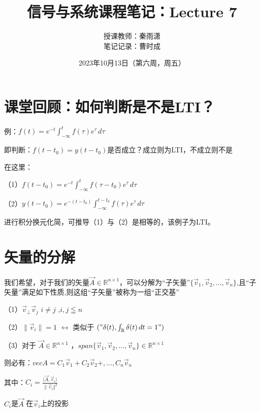 \documentclass[UTF8]{ctexart}
\title{信号与系统课程笔记：Lecture 7}
\author{授课教师：秦雨潇 \\
笔记记录：曹时成}
\date{2023年10月13日（第六周，周五）}
\begin{document}
\maketitle
\section{课堂回顾：如何判断是不是LTI？}
例：$f(t)=e^{-t}\int_{-\infty}^{t} f(\tau ) e^\tau \,d\tau  $ \par
即判断：$f(t-t_0)=y(t-t_0) $是否成立？成立则为LTI，不成立则不是\par
在这里：\par
（1）$f(t-t_0)=e^{-t}\int_{-\infty}^{t}f(\tau -t_0)e^\tau\,d\tau   $ \par
（2）$y(t-t_0)=e^{-(t-t_0)}\int_{-\infty}^{t-t_0}f(\tau )e^\tau\,d\tau   $ \par
进行积分换元化简，可推导（1）与（2）是相等的，该例子为LTI。\par

\section{矢量的分解}
我们希望，对于我们的矢量$\vec{A}\in \mathbb{R} ^{n\times 1}$，可以分解为“子矢量”$\{\vec{v}_1,\vec{v}_2,\ldots ,\vec{v}_n \} $,且“子矢量”满足如下性质,则这组“子矢量”被称为一组“正交基”\par
（1）$\vec{v}_\perp \vec{v}_j$ \qquad $i\neq j$ ,\quad $i,j\leqq n$\par
（2）$\parallel \vec{v}_i \parallel = 1 $ $\leftrightarrow$ 类似于 $("\delta (t),\int_\mathbb{R} \delta (t)\,dt=1")$\par
（3）对于 $\vec{A}\in \mathbb{R} ^{n\times 1}$ ，$span\{\vec{v}_1,\vec{v}_2,\ldots ,\vec{v}_n \}  \in \mathbb{R} ^{n\times 1} $ \par
则必有：$vec{A}=C_1 \vec{v}_1+C_2 \vec{v}_2+,\ldots ,C_n \vec{v}_n$ \par
其中：$C_i=\frac{\langle \vec{A},\vec{v}_i \rangle }{\|\vec{v}_i \Vert^2 }  $\par
 \qquad $C_i$是$\vec{A}$ 在$\vec{v}_i$上的投影 \par
\end{document}
